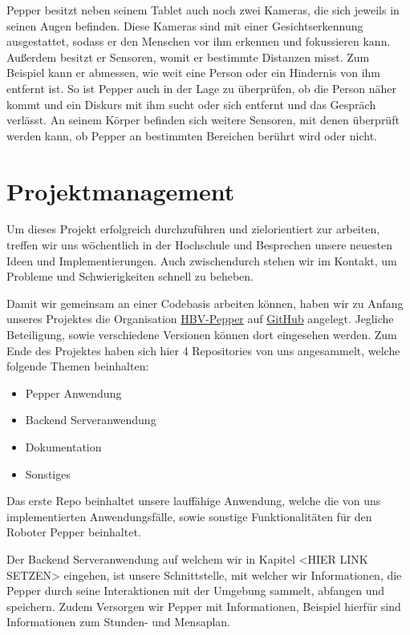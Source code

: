 Pepper besitzt neben seinem Tablet auch noch zwei Kameras, die sich jeweils in seinen Augen befinden. Diese Kameras sind mit einer Gesichtserkennung ausgestattet, sodass er den Menschen vor ihm erkennen und fokussieren kann. Außerdem besitzt er Sensoren, womit er bestimmte Distanzen misst. Zum Beispiel kann er abmessen, wie weit eine Person oder ein Hindernis von ihm entfernt ist. So ist Pepper auch in der Lage zu überprüfen, ob die Person näher kommt und ein Diskurs mit ihm sucht oder sich entfernt und das Gespräch verlässt.
An seinem Körper befinden sich weitere Sensoren, mit denen überprüft werden kann, ob Pepper an bestimmten Bereichen berührt wird oder nicht.\\


\section{Projektmanagement}
Um dieses Projekt erfolgreich durchzuführen und zielorientiert zur arbeiten, treffen wir uns wöchentlich
in der Hochschule und Besprechen unsere neuesten Ideen und Implementierungen. Auch zwischendurch
stehen wir im Kontakt, um Probleme und Schwierigkeiten schnell zu beheben.

Damit wir gemeinsam an einer Codebasis arbeiten können, haben wir zu Anfang unseres Projektes
die Organisation \href{https://github.com/ProjectPepperHSB}{HBV-Pepper} auf
\href{https://github.com}{GitHub} angelegt. Jegliche Beteiligung, sowie verschiedene Versionen können dort eingesehen werden.
Zum Ende des Projektes haben sich hier 4 Repositories von uns angesammelt, welche folgende Themen beinhalten:
\begin{itemize}
    \item Pepper Anwendung
    \item Backend Serveranwendung
    \item Dokumentation
    \item Sonstiges
\end{itemize}

Das erste Repo beinhaltet unsere lauffähige Anwendung, welche die von uns
implementierten Anwendungsfälle, sowie sonstige Funktionalitäten für den Roboter Pepper beinhaltet.

Der Backend Serveranwendung auf welchem wir in Kapitel <HIER LINK SETZEN> eingehen, ist unsere Schnittstelle, mit welcher wir
Informationen, die Pepper durch seine Interaktionen mit der Umgebung sammelt, abfangen und speichern. Zudem Versorgen wir
Pepper mit Informationen, Beispiel hierfür sind Informationen zum Stunden- und Mensaplan.

